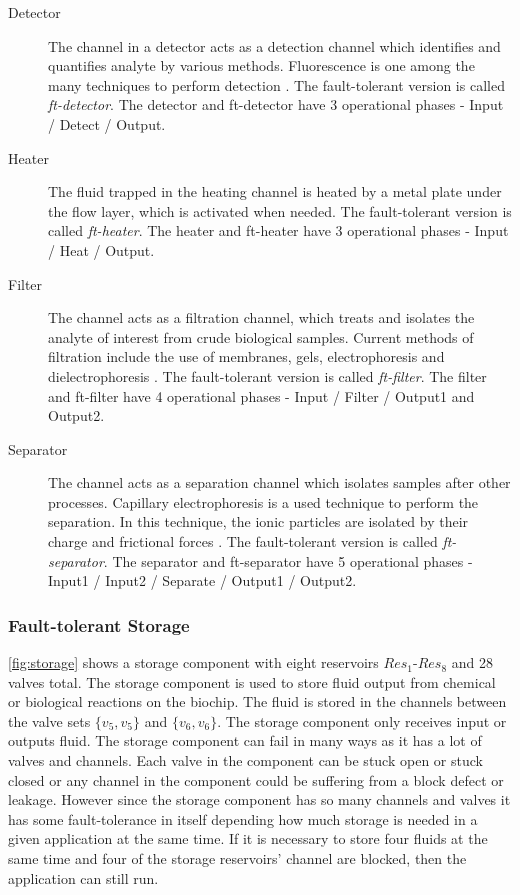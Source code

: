 \begin{description}
\item[Detector] The channel in a detector acts as a detection channel which identifies and quantifies analyte by various methods. Fluorescence is one among the many techniques to perform detection \cite{component-view}. The fault-tolerant version is called \emph{ft-detector}. The detector and ft-detector have 3 operational phases - Input / Detect / Output.

\item[Heater] The fluid trapped in the heating channel is heated by a metal plate under the flow layer, which is activated when needed. The fault-tolerant version is called \emph{ft-heater}. The heater and ft-heater have 3 operational phases - Input / Heat / Output.

\item[Filter] The channel acts as a filtration channel, which treats and isolates the analyte of interest from crude biological samples. Current methods of filtration include the use of membranes, gels, electrophoresis and dielectrophoresis \cite{component-view}. The fault-tolerant version is called \emph{ft-filter}. The filter and ft-filter have 4 operational phases - Input / Filter / Output1 and Output2.

\item[Separator] The channel acts as a separation channel which isolates samples after other processes. Capillary electrophoresis is a used technique to perform the separation. In this technique, the ionic particles are isolated by their charge and frictional forces \cite{component-view}. The fault-tolerant version is called \emph{ft-separator}. The separator and ft-separator have 5 operational phases - Input1 / Input2 / Separate / Output1 / Output2.

\end{description}


\subsubsection{Fault-tolerant Storage}
\autoref{fig:storage} shows a storage component with eight reservoirs $Res_1$-$Res_8$ and 28 valves total. The storage component is used to store fluid output from chemical or biological reactions on the biochip. The fluid is stored in the channels between the valve sets $\{v_5, v_5\}$ and $\{v_6, v_6\}$. The storage component only receives input or outputs fluid. The storage component can fail in many ways as it has a lot of valves and channels. Each valve in the component can be stuck open or stuck closed or any channel in the component could be suffering from a block defect or leakage. However since the storage component has so many channels and valves it has some fault-tolerance in itself depending how much storage is needed in a given application at the same time. If it is necessary to store four fluids at the same time and four of the storage reservoirs' channel are blocked, then the application can still run.

